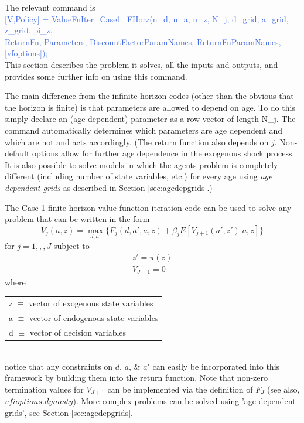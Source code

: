  
The relevant command is \\
\textcolor{RoyalBlue}{[V,Policy] = ValueFnIter\_{}Case1\_{}FHorz(n\_{}d, n\_{}a, n\_{}z, N\_{}j, d\_{}grid, a\_{}grid, z\_{}grid, pi\_{}z, } \\
\indent \indent \textcolor{RoyalBlue}{ReturnFn, Parameters, DiscountFactorParamNames, ReturnFnParamNames, [vfoptions]);} \\
This section describes the problem it solves, all the inputs and outputs, and provides some further info on using this command.

The main difference from the infinite horizon codes (other than the obvious that the horizon is finite) is that parameters are allowed
to depend on age. To do this simply declare an (age dependent) parameter as a row vector of length N\_{}j. The command automatically
determines which parameters are age dependent and which are not and acts accordingly. (The return function also depends
on $j$. Non-default options allow for further age dependence in the exogenous shock process. It is also possible to solve models in which the agents problem is completely different (including number of state variables, etc.) for every age using \textit{age dependent grids} as described in Section \ref{sec:agedepgrids}.)

The Case 1 finite-horizon value function iteration code can be used to solve any problem that can be written in the form
\begin{equation*}
 V_j(a,z)= \max_{d,a'} \{ F_j(d,a',a,z) + \beta_j E[V_{j+1}(a',z')|a,z] \}
\end{equation*}
for $j=1,,,J$ subject to
\begin{eqnarray*}
 z'=\pi(z) \\
 V_{J+1}=0
\end{eqnarray*}
where \\
\begin{tabular} {l}
 z $\equiv$ vector of exogenous state variables \\
 a $\equiv$ vector of endogenous state variables \\
 d $\equiv$ vector of decision variables
\end{tabular} \\
notice that any constraints on $d$, $a$, \& $a'$ can easily be incorporated into this framework by building them into the return function.
Note that non-zero termination values for $V_{J+1}$ can be implemented via the definition of $F_J$ (see also, $vfioptions.dynasty$). More complex problems can be solved using 'age-dependent grids', see Section \ref{sec:agedepgrids}.

